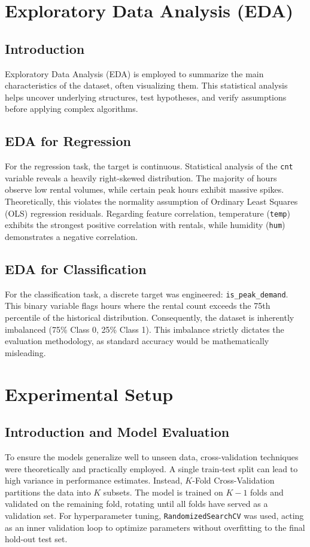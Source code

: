 \documentclass[12pt,a4paper]{article}
\begin{document}
\section{Exploratory Data Analysis (EDA)}
\subsection{Introduction}
Exploratory Data Analysis (EDA) is employed to summarize the main characteristics of the dataset, often visualizing them. This statistical analysis helps uncover underlying structures, test hypotheses, and verify assumptions before applying complex algorithms.

\subsection{EDA for Regression}
For the regression task, the target is continuous. Statistical analysis of the \texttt{cnt} variable reveals a heavily right-skewed distribution. The majority of hours observe low rental volumes, while certain peak hours exhibit massive spikes. Theoretically, this violates the normality assumption of Ordinary Least Squares (OLS) regression residuals. 
Regarding feature correlation, temperature (\texttt{temp}) exhibits the strongest positive correlation with rentals, while humidity (\texttt{hum}) demonstrates a negative correlation.

\subsection{EDA for Classification}
For the classification task, a discrete target was engineered: \texttt{is\_peak\_demand}. This binary variable flags hours where the rental count exceeds the 75th percentile of the historical distribution. Consequently, the dataset is inherently imbalanced (75\% Class 0, 25\% Class 1). This imbalance strictly dictates the evaluation methodology, as standard accuracy would be mathematically misleading.

\section{Experimental Setup}
\subsection{Introduction and Model Evaluation}
To ensure the models generalize well to unseen data, cross-validation techniques were theoretically and practically employed. A single train-test split can lead to high variance in performance estimates. Instead, $K$-Fold Cross-Validation partitions the data into $K$ subsets. The model is trained on $K-1$ folds and validated on the remaining fold, rotating until all folds have served as a validation set. For hyperparameter tuning, \texttt{RandomizedSearchCV} was used, acting as an inner validation loop to optimize parameters without overfitting to the final hold-out test set.
\end{document}
